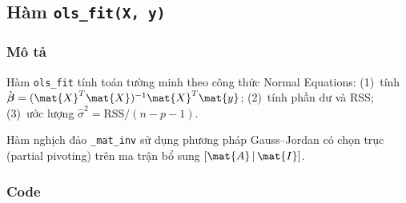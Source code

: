 \subsection{Hàm \texttt{ols\_fit(X, y)}}

\subsubsection{Mô tả}

Hàm \texttt{ols\_fit} tính toán tường minh theo công thức Normal Equations:
(1)~tính $\hat{\boldsymbol{\beta}} = (\mat{X}^T\mat{X})^{-1}\mat{X}^T\mat{y}$;
(2)~tính phần dư và RSS; (3)~ước lượng $\hat{\sigma}^2 = \mathrm{RSS}/(n-p-1)$.

\begin{note}
Hàm nghịch đảo \texttt{\_mat\_inv} sử dụng phương pháp Gauss--Jordan có chọn trục
(partial pivoting) trên ma trận bổ sung $[\mat{A}\,|\,\mat{I}]$.
\end{note}

\subsubsection{Code}

